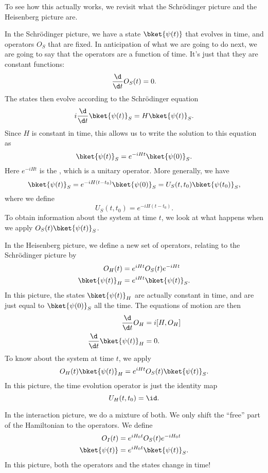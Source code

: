 \documentclass[a4paper]{article}
\begin{document}
To see how this actually works, we revisit what the Schr\"odinger picture and the Heisenberg picture are.

\separator

In the Schr\"odinger picture, we have a state $\bket{\psi(t)}$ that evolves in time, and operators $O_S$ that are fixed. In anticipation of what we are going to do next, we are going to say that the operators are a function of time. It's just that they are constant functions:
\[
  \frac{\d}{\d t}O_S(t) = 0.
\]
The states then evolve according to the Schr\"odinger equation
\[
  i \frac{\d}{\d t} \bket{\psi(t)}_S = H \bket{\psi(t)}_S.
\]
Since $H$ is constant in time, this allows us to write the solution to this equation as
\[
  \bket{\psi(t)}_S = e^{-iHt} \bket{\psi(0)}_S.
\]
Here $e^{-iHt}$ is the , which is a unitary operator. More generally, we have
\[
  \bket{\psi(t)}_S = e^{-iH(t - t_0)} \bket{\psi(0)}_S = U_S(t, t_0) \bket{\psi(t_0)}_S,
\]
where we define
\[
  U_S(t, t_0) = e^{-iH(t - t_0)}.
\]
To obtain information about the system at time $t$, we look at what happens when we apply $O_S(t) \bket{\psi(t)}_S$.

\separator

In the Heisenberg picture, we define a new set of operators, relating to the Schr\"odinger picture by
\begin{align*}
  O_H(t) &= e^{iHt} O_S(t) e^{-iHt}\\
  \bket{\psi(t)}_H &= e^{iHt}\bket{\psi(t)}_S.
\end{align*}
In this picture, the states $\bket{\psi(t)}_H$ are actually constant in time, and are just equal to $\bket{\psi(0)}_S$ all the time. The equations of motion are then
\begin{align*}
  \frac{\d}{\d t}O_H &= i [H, O_H]\\
  \frac{\d}{\d t}\bket{\psi(t)}_H &= 0.
\end{align*}
To know about the system at time $t$, we apply
\[
  O_H(t) \bket{\psi(t)}_H = e^{iHt}O_S(t) \bket{\psi(t)}_S.
\]
In this picture, the time evolution operator is just the identity map
\[
  U_H(t, t_0) = \id.
\]
\separator

In the interaction picture, we do a mixture of both. We only shift the ``free'' part of the Hamiltonian to the operators. We define
\begin{align*}
  O_I(t) &= e^{iH_0 t}O_S(t) e^{-iH_0 t}\\
  \bket{\psi(t)} &= e^{iH_0 t}\bket{\psi(t)}_S.
\end{align*}
In this picture, both the operators and the states change in time!
\end{document}
